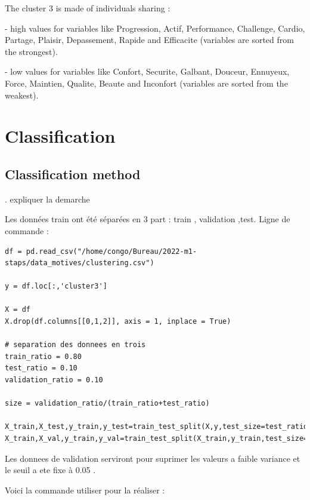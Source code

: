 \documentclass[12pt]{article}
\begin{document}
The cluster 3 is made of individuals sharing :


-	high values for variables like Progression, Actif, Performance, Challenge, Cardio, Partage, Plaisir, Depassement, Rapide and Efficacite (variables are sorted from the strongest).

-	low values for variables like Confort, Securite, Galbant, Douceur, Ennuyeux, Force, Maintien, Qualite, Beaute and Inconfort (variables are sorted from the weakest).





\newpage


\section{Classification}  %

\subsection{Classification method} 
. expliquer la demarche 

Les données train ont été séparées  en 3 part : train , validation ,test.
Ligne de commande :

\begin{small}

\begin{lstlisting}
df = pd.read_csv("/home/congo/Bureau/2022-m1-staps/data_motives/clustering.csv") 

y = df.loc[:,'cluster3']

X = df
X.drop(df.columns[[0,1,2]], axis = 1, inplace = True)   

# separation des donnees en trois
train_ratio = 0.80
test_ratio = 0.10
validation_ratio = 0.10

size = validation_ratio/(train_ratio+test_ratio)

X_train,X_test,y_train,y_test=train_test_split(X,y,test_size=test_ratio)
X_train,X_val,y_train,y_val=train_test_split(X_train,y_train,test_size=size)

\end{lstlisting}
\end{small}


\setlength{\parindent}{0pt} Les donnees de validation serviront pour suprimer les valeurs a faible variance et  le seuil a ete fixe à 0.05 .

\setlength{\parindent}{0pt} Voici la commande utiliser pour la réaliser : 
\end{document}
